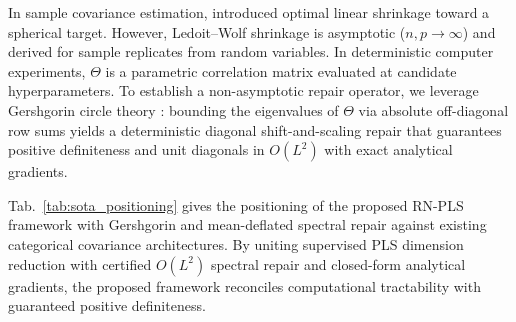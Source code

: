 \documentclass[default,sn-mathphys,Numbered]{sn-jnl}
\theoremstyle{thmstyleone}
\theoremstyle{thmstylethree}
\theoremstyle{thmstyletwo}
\begin{document}
In sample covariance estimation, \citet{ledoit2004well} introduced optimal linear shrinkage toward a spherical target. However, Ledoit--Wolf shrinkage is asymptotic ($n, p \to \infty$) and derived for sample replicates from random variables. In deterministic computer experiments, $\Theta$ is a parametric correlation matrix evaluated at candidate hyperparameters. To establish a non-asymptotic repair operator, we leverage Gershgorin circle theory \citep{horn2012matrix}: bounding the eigenvalues of $\Theta$ via absolute off-diagonal row sums yields a deterministic diagonal shift-and-scaling repair that guarantees positive definiteness and unit diagonals in $O(L^2)$ with exact analytical gradients.


Tab.~\ref{tab:sota_positioning} gives the positioning of the proposed RN-PLS framework with Gershgorin and mean-deflated spectral repair against existing categorical covariance architectures. By uniting supervised PLS dimension reduction with certified $O(L^2)$ spectral repair and closed-form analytical gradients, the proposed framework reconciles computational tractability with guaranteed positive definiteness.
\end{document}
